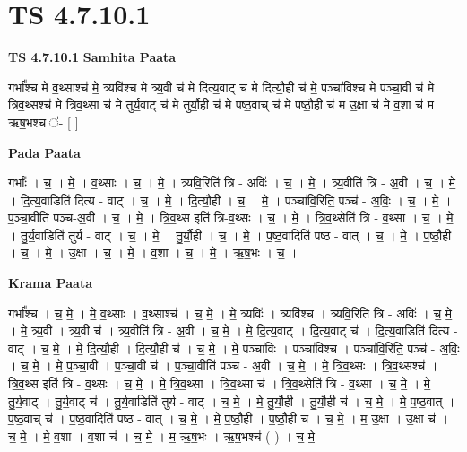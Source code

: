 \documentclass[17pt]{extarticle}
\begin{document}
\section{ TS 4.7.10.1 }

\textbf{TS 4.7.10.1 } \newline
\textbf{Samhita Paata} \newline

गर्भा᳚श्च मे व॒थ्साश्च॑ मे॒ त्र्यवि॑श्च मे त्र्य॒वी च॑ मे दित्य॒वाट् च॑ मे दित्यौ॒ही च॑ मे॒ पञ्चा॑विश्च मे पञ्चा॒वी च॑ मे त्रिव॒थ्सश्च॑ मे त्रिव॒थ्सा च॑ मे तुर्य॒वाट् च॑ मे तुर्यौ॒ही च॑ मे पष्ठ॒वाच् च॑ मे पष्ठौ॒ही च॑ म उ॒क्षा च॑ मे व॒शा च॑ म ऋष॒भश्च ॑- [  ] \newline

\textbf{Pada Paata} \newline

गर्भाः᳚ । च॒ । मे॒ । व॒थ्साः । च॒ । मे॒ । त्र्यवि॒रिति॑ त्रि - अविः॑ । च॒ । मे॒ । त्र्य॒वीति॑ त्रि - अ॒वी । च॒ । मे॒ । दि॒त्य॒वाडिति॑ दित्य - वाट् । च॒ । मे॒ । दि॒त्यौ॒ही । च॒ । मे॒ । पञ्चा॑वि॒रिति॒ पञ्च॑ - अ॒विः॒ । च॒ । मे॒ । प॒ञ्चा॒वीति॑ पञ्च-अ॒वी । च॒ । मे॒ । त्रि॒व॒थ्स इति॑ त्रि-व॒थ्सः । च॒ । मे॒ । त्रि॒व॒थ्सेति॑ त्रि - व॒थ्सा । च॒ । मे॒ । तु॒र्य॒वाडिति॑ तुर्य - वाट् । च॒ । मे॒ । तु॒र्यौ॒ही । च॒ । मे॒ । प॒ष्ठ॒वादिति॑ पष्ठ - वात् । च॒ । मे॒ । प॒ष्ठौ॒ही । च॒ । मे॒ । उ॒क्षा । च॒ । मे॒ । व॒शा । च॒ । मे॒ । ऋ॒ष॒भः । च॒ ।  \newline


\textbf{Krama Paata} \newline

गर्भा᳚श्च । च॒ मे॒ । मे॒ व॒थ्साः । व॒थ्साश्च॑ । च॒ मे॒ । मे॒ त्र्यविः॑ । त्र्यवि॑श्च । त्र्यवि॒रिति॑ त्रि - अविः॑ । च॒ मे॒ । मे॒ त्र्य॒वी । त्र्य॒वी च॑ । त्र्य॒वीति॑ त्रि - अ॒वी । च॒ मे॒ । मे॒ दि॒त्य॒वाट् । दि॒त्य॒वाट् च॑ । दि॒त्य॒वाडिति॑ दित्य - वाट् । च॒ मे॒ । मे॒ दि॒त्यौ॒ही । दि॒त्यौ॒ही च॑ । च॒ मे॒ । मे॒ पञ्चा॑विः । पञ्चा॑विश्च । पञ्चा॑वि॒रिति॒ पञ्च॑ - अ॒विः॒ । च॒ मे॒ । मे॒ प॒ञ्चा॒वी । प॒ञ्चा॒वी च॑ । प॒ञ्चा॒वीति॑ पञ्च - अ॒वी । च॒ मे॒ । मे॒ त्रि॒व॒थ्सः । त्रि॒व॒थ्सश्च॑ । त्रि॒व॒थ्स इति॑ त्रि - व॒थ्सः । च॒ मे॒ । मे॒ त्रि॒व॒थ्सा । त्रि॒व॒थ्सा च॑ । त्रि॒व॒थ्सेति॑ त्रि - व॒थ्सा । च॒ मे॒ । मे॒ तु॒र्य॒वाट् । तु॒र्य॒वाट् च॑ । तु॒र्य॒वाडिति॑ तुर्य - वाट् । च॒ मे॒ । मे॒ तु॒र्यौ॒ही । तु॒र्यौ॒ही च॑ । च॒ मे॒ । मे॒ प॒ष्ठ॒वात् । प॒ष्ठ॒वाच् च॑ । प॒ष्ठ॒वादिति॑ पष्ठ - वात् । च॒ मे॒ । मे॒ प॒ष्ठौ॒ही । प॒ष्ठौ॒ही च॑ । च॒ मे॒ । म॒ उ॒क्षा । उ॒क्षा च॑ । च॒ मे॒ । मे॒ व॒शा । व॒शा च॑ । च॒ मे॒ । म॒ ऋ॒ष॒भः । ऋ॒ष॒भश्च॑ ( ) । च॒ मे॒ \newline
\end{document}
